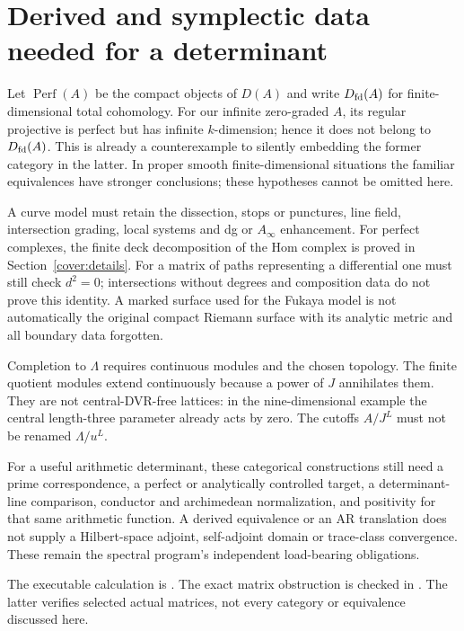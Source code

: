 \documentclass[11pt,oneside,openany]{book}
\theoremstyle{definition}\newtheorem{definition}[theorem]{Definition}
\theoremstyle{remark}\newtheorem{remark}[theorem]{Remark}
\begin{document}
\section{Derived and symplectic data needed for a determinant}
Let $\operatorname{Perf}(A)$ be the compact objects of $D(A)$ and write
$D_{\rm fd}(A)$ for finite-dimensional total cohomology. For our infinite
zero-graded $A$, its regular projective is perfect but has infinite
$k$-dimension; hence it does not belong to $D_{\rm fd}(A)$. This is already
a counterexample to silently embedding the former category in the latter.
In proper smooth finite-dimensional situations the familiar equivalences
have stronger conclusions; these hypotheses cannot be omitted here.

A curve model must retain the dissection, stops or punctures, line field,
intersection grading, local systems and dg or $A_\infty$ enhancement.
For perfect complexes, the finite deck decomposition of the Hom complex is
proved in Section~\ref{cover:details}. For a matrix of paths representing a
differential one must still check $d^2=0$; intersections without degrees and
composition data do not prove this identity. A marked surface used for the
Fukaya model is not automatically the original compact Riemann surface
with its analytic metric and all boundary data forgotten.

Completion to $\Lambda$ requires continuous modules and the chosen topology.
The finite quotient modules extend continuously because a power of $J$
annihilates them. They are not central-DVR-free lattices: in the
nine-dimensional example the central length-three parameter already acts
by zero. The cutoffs $A/J^L$ must not be renamed $\Lambda/u^L$.

For a useful arithmetic determinant, these categorical constructions still
need a prime correspondence, a perfect or analytically controlled target,
a determinant-line comparison, conductor and archimedean normalization,
and positivity for that same arithmetic function. A derived equivalence
or an AR translation does not supply a Hilbert-space adjoint, self-adjoint
domain or trace-class convergence. These remain the spectral program's
independent load-bearing obligations.

The executable calculation is .
The exact matrix obstruction is checked in .
The latter verifies selected actual matrices, not every category or
equivalence discussed here.
\end{document}
